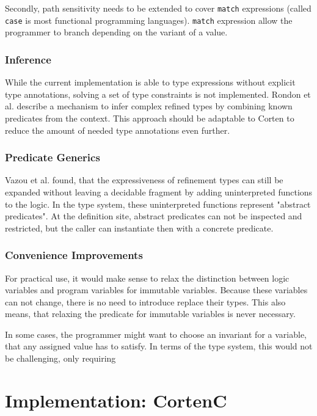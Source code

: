 \documentclass{book}
\newcommand{\code}[1]{\texttt{#1}}
\theoremstyle{definition}
\begin{document}
Secondly, path sensitivity needs to be extended to cover \code{match} expressions (called \code{case} is most functional programming languages). \code{match} expression allow the programmer to branch depending on the variant of a value.

\subsection{Inference}

While the current implementation is able to type expressions without explicit type annotations, solving a set of type constraints is not implemented. 
Rondon et al. \cite{rondon_liquid_2008} describe a mechanism to infer complex refined types by combining known predicates from the context. This approach should be adaptable to Corten to reduce the amount of needed type annotations even further.


\subsection{Predicate Generics}

Vazou et al. \cite{vazou_abstract_2013} found, that the expressiveness of refinement types can still be expanded without leaving a decidable fragment by adding uninterpreted functions to the logic. In the type system, these uninterpreted functions represent "abstract predicates". At the definition site, abstract predicates can not be inspected and restricted, but the caller can instantiate then with a concrete predicate.

\subsection{Convenience Improvements}

For practical use, it would make sense to relax the distinction between logic variables and program variables for immutable variables. Because these variables can not change, there is no need to introduce replace their types. This also means, that relaxing the predicate for immutable variables is never necessary.

In some cases, the programmer might want to choose an invariant for a variable, that any assigned value has to satisfy. In terms of the type system, this would not be challenging, only requiring 

\chapter{Implementation: CortenC}
\end{document}
